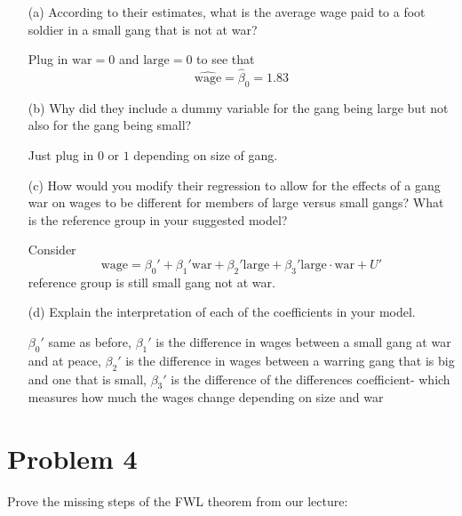 \documentclass[11pt]{article}
\begin{document}
\begin{enumerate}
    \item[(a)] According to their estimates, what is the average wage paid to a foot soldier in a small gang that is not at war?
    \begin{solution}
        Plug in $\text{war} = 0$ and $\text{large} = 0$ to see that 
        \[\hat{\text{wage}} = \hat\beta_0 = 1.83\]
    \end{solution}
    
    \item[(b)] Why did they include a dummy variable for the gang being large but not also for the gang being small?
    \begin{solution}
Just plug in $0$ or $1$ depending on size of gang. 
    \end{solution}
    \item[(c)] How would you modify their regression to allow for the effects of a gang war on wages to be different for members of large versus small gangs? What is the reference group in your suggested model?
    \begin{solution}
        Consider 
        \[\text{wage} = \beta_0' + \beta_1' \text{war} + \beta_2' \text{large} + \beta_3' \text{large} \cdot \text{war} + U'\] reference group is still small gang not at war.
    \end{solution}
    
    \item[(d)] Explain the interpretation of each of the coefficients in your model.
    \begin{solution}
        $\beta_0'$ same as before, $\beta_1'$ is the difference in wages between a small gang at war and at peace, $\beta_2'$ is the difference in wages between a warring gang that is big and one that is small, $\beta_3'$ is the difference of the differences coefficient- which measures how much the wages change depending on size and war 
    \end{solution}
\end{enumerate}

\newpage
\section*{Problem 4}

Prove the missing steps of the FWL theorem from our lecture:
\end{document}
